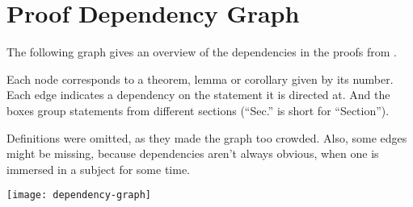 \appendix
\section{Proof Dependency Graph}\label{sec:dependency-graph}

The following graph gives an overview of the dependencies in the proofs from \textcite{shitov2020sublinear}.

Each node corresponds to a theorem, lemma or corollary given by its number.
Each edge indicates a dependency on the statement it is directed at.
And the boxes group statements from different sections (``Sec.'' is short for ``Section'').

Definitions were omitted, as they made the graph too crowded.
Also, some edges might be missing, because dependencies aren't always obvious, when one is immersed in a subject for some time.

\newpage
\texttt{[image: dependency-graph]}
\newpage
